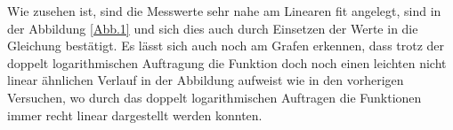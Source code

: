 \documentclass[../protokoll.tex]{subfiles}
\begin{document}
Wie zusehen ist, sind die Messwerte sehr nahe am Linearen fit angelegt, sind in der Abbildung \ref{Abb.1} und sich dies auch durch Einsetzen der Werte in die Gleichung bestätigt. Es lässt sich auch noch am Grafen erkennen, dass trotz der doppelt logarithmischen Auftragung die Funktion doch noch einen leichten nicht linear ähnlichen Verlauf in der Abbildung aufweist wie in den vorherigen Versuchen, wo durch das doppelt logarithmischen Auftragen die Funktionen immer recht linear dargestellt werden konnten.
\end{document}
